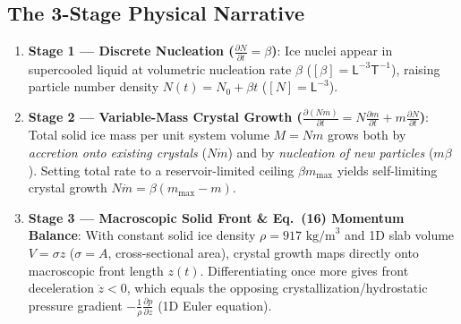 \documentclass[11pt,a4paper]{article}
\newcommand{\pd}[2]{\frac{\partial #1}{\partial #2}}
\newcommand{\dimbr}[1]{\left[#1\right]}
\begin{document}
\subsection{The 3-Stage Physical Narrative}
\begin{enumerate}[leftmargin=1.5em,itemsep=3pt]
  \item \textbf{Stage 1 — Discrete Nucleation ($\pd{N}{t} = \beta$)}: Ice nuclei appear in supercooled liquid at volumetric nucleation rate $\beta$ ($\dimbr{\beta} = \mathsf{L}^{-3}\mathsf{T}^{-1}$), raising particle number density $N(t) = N_0 + \beta t$ ($\dimbr{N} = \mathsf{L}^{-3}$).
  \item \textbf{Stage 2 — Variable-Mass Crystal Growth ($\pd{(Nm)}{t} = N\pd{m}{t} + m\pd{N}{t}$)}: Total solid ice mass per unit system volume $M = N m$ grows both by \emph{accretion onto existing crystals} ($N\dot{m}$) and by \emph{nucleation of new particles} ($m\beta$). Setting total rate to a reservoir-limited ceiling $\beta m_{\max}$ yields self-limiting crystal growth $N\dot{m} = \beta(m_{\max} - m)$.
  \item \textbf{Stage 3 — Macroscopic Solid Front \& Eq.~(16) Momentum Balance}: With constant solid ice density $\rho = 917\text{ kg/m}^3$ and 1D slab volume $V = \sigma z$ ($\sigma = A$, cross-sectional area), crystal growth maps directly onto macroscopic front length $z(t)$. Differentiating once more gives front deceleration $\ddot{z} < 0$, which equals the opposing crystallization/hydrostatic pressure gradient $-\frac{1}{\rho}\pd{p}{z}$ (1D Euler equation).
\end{enumerate}
\end{document}
